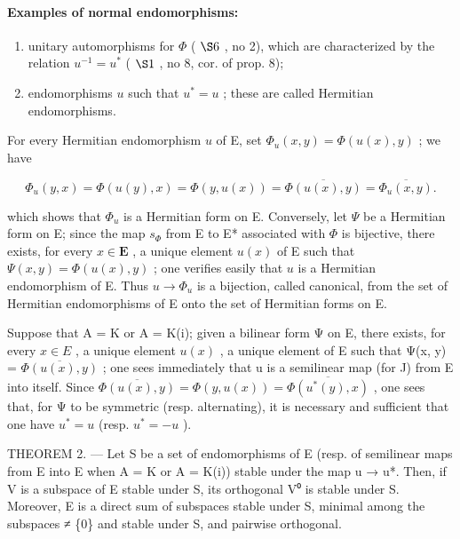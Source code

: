 \paragraph{Examples of normal endomorphisms:}

\begin{enumerate}
\def\labelenumi{\arabic{enumi})}
\item
  unitary automorphisms for \(\Phi\) ( \(\S 6\) , no 2), which are characterized by the relation \(u^{-1} = u^{*}\) ( \(\S 1\) , no 8, cor. of prop. 8);
\item
  endomorphisms \(u\) such that \(u^{*}=u\) ; these are called Hermitian endomorphisms.
\end{enumerate}

For every Hermitian endomorphism \(u\) of E, set \(\Phi_{u}(x,y)=\Phi(u(x),y)\) ; we have

\[
\Phi_ {u} (y, x) = \Phi (u (y), x) = \Phi (y, u (x)) = \overline {{\Phi (u (x) , y)}} = \overline {{\Phi_ {u} (x , y)}}.
\]

which shows that \(\Phi_{u}\) is a Hermitian form on E. Conversely, let \(\Psi\) be a Hermitian form on E; since the map \(s_{\Phi}\) from E to E* associated with \(\Phi\) is bijective, there exists, for every \(x \in \mathbf{E}\) , a unique element \(u(x)\) of E such that \(\Psi(x, y) = \Phi(u(x), y)\) ; one verifies easily that \(u\) is a Hermitian endomorphism of E. Thus \(u \to \Phi_{u}\) is a bijection, called canonical, from the set of Hermitian endomorphisms of E onto the set of Hermitian forms on E.

Suppose that A = K or A = K(i); given a bilinear form Ψ on E, there exists, for every \(x \in E\) , a unique element \(u(x)\) , a unique element of E such that Ψ(x, y) = \(\overline{\Phi(u(x), y)}\) ; one sees immediately that u is a semilinear map (for J) from E into itself. Since \(\overline{\Phi(u(x), y)} = \Phi(y, u(x)) = \overline{\Phi(u^{*}(y), x)}\) , one sees that, for Ψ to be symmetric (resp. alternating), it is necessary and sufficient that one have \(u^{*} = u\) (resp. \(u^{*} = -u\) ).

THEOREM 2. --- Let S be a set of endomorphisms of E (resp. of semilinear maps from E into E when A = K or A = K(i)) stable under the map u → u*. Then, if V is a subspace of E stable under S, its orthogonal V⁰ is stable under S. Moreover, E is a direct sum of subspaces stable under S, minimal among the subspaces ≠ \{0\} and stable under S, and pairwise orthogonal.

